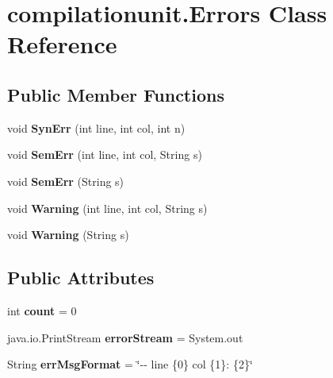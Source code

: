 \hypertarget{classcompilationunit_1_1_errors}{
\section{compilationunit.Errors Class Reference}
\label{classcompilationunit_1_1_errors}
}
\subsection*{Public Member Functions}
\begin{DoxyCompactItemize}
\item 
\hypertarget{classcompilationunit_1_1_errors_ac2053f3bb5a53673a70b262e6250246d}{
void {\bfseries SynErr} (int line, int col, int n)}
\label{classcompilationunit_1_1_errors_ac2053f3bb5a53673a70b262e6250246d}

\item 
\hypertarget{classcompilationunit_1_1_errors_a14664925958cd8c1193ba7d85a1988e8}{
void {\bfseries SemErr} (int line, int col, String s)}
\label{classcompilationunit_1_1_errors_a14664925958cd8c1193ba7d85a1988e8}

\item 
\hypertarget{classcompilationunit_1_1_errors_ab43cf2190bb8ebe8da996fe1479ba3b7}{
void {\bfseries SemErr} (String s)}
\label{classcompilationunit_1_1_errors_ab43cf2190bb8ebe8da996fe1479ba3b7}

\item 
\hypertarget{classcompilationunit_1_1_errors_a06d1e1b28fe58ac2e8284dcd192a9ded}{
void {\bfseries Warning} (int line, int col, String s)}
\label{classcompilationunit_1_1_errors_a06d1e1b28fe58ac2e8284dcd192a9ded}

\item 
\hypertarget{classcompilationunit_1_1_errors_a85c9a631094f6e4e0263b421232c57d5}{
void {\bfseries Warning} (String s)}
\label{classcompilationunit_1_1_errors_a85c9a631094f6e4e0263b421232c57d5}

\end{DoxyCompactItemize}
\subsection*{Public Attributes}
\begin{DoxyCompactItemize}
\item 
\hypertarget{classcompilationunit_1_1_errors_abd4ff7c6e32c9b776c167249d0f7a4b9}{
int {\bfseries count} = 0}
\label{classcompilationunit_1_1_errors_abd4ff7c6e32c9b776c167249d0f7a4b9}

\item 
\hypertarget{classcompilationunit_1_1_errors_a02c3d673fc0b3f8309fa28b0ebc95413}{
java.io.PrintStream {\bfseries errorStream} = System.out}
\label{classcompilationunit_1_1_errors_a02c3d673fc0b3f8309fa28b0ebc95413}

\item 
\hypertarget{classcompilationunit_1_1_errors_ae63e3b8ae152dfcddb7e3e33f28bae14}{
String {\bfseries errMsgFormat} = \char`\"{}-\/-\/ line \{0\} col \{1\}: \{2\}\char`\"{}}
\label{classcompilationunit_1_1_errors_ae63e3b8ae152dfcddb7e3e33f28bae14}

\end{DoxyCompactItemize}
